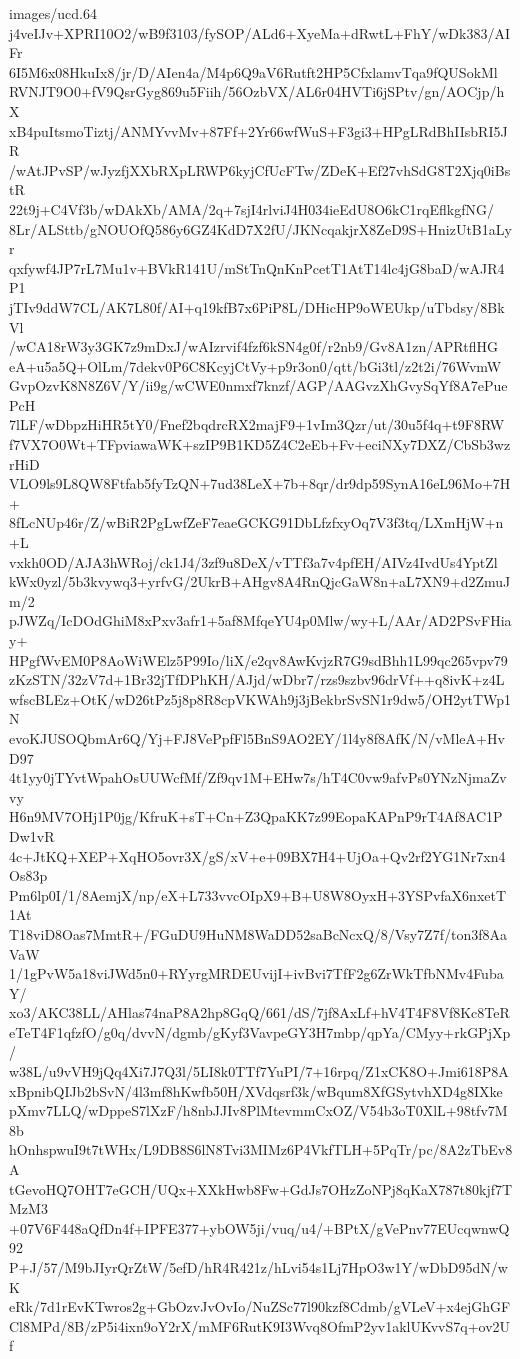 \begin{filecontents*}{images/ucd.64}
j4veIJv+XPRI10O2/wB9f3103/fySOP/ALd6+XyeMa+dRwtL+FhY/wDk383/AIFr
6I5M6x08HkuIx8/jr/D/AIen4a/M4p6Q9aV6Rutft2HP5CfxlamvTqa9fQUSokMl
RVNJT9O0+fV9QsrGyg869u5Fiih/56OzbVX/AL6r04HVTi6jSPtv/gn/AOCjp/hX
xB4puItsmoTiztj/ANMYvvMv+87Ff+2Yr66wfWuS+F3gi3+HPgLRdBhIIsbRI5JR
/wAtJPvSP/wJyzfjXXbRXpLRWP6kyjCfUcFTw/ZDeK+Ef27vhSdG8T2Xjq0iBstR
22t9j+C4Vf3b/wDAkXb/AMA/2q+7sjI4rlviJ4H034ieEdU8O6kC1rqEflkgfNG/
8Lr/ALSttb/gNOUOfQ586y6GZ4KdD7X2fU/JKNcqakjrX8ZeD9S+HnizUtB1aLyr
qxfywf4JP7rL7Mu1v+BVkR141U/mStTnQnKnPcetT1AtT14lc4jG8baD/wAJR4P1
jTIv9ddW7CL/AK7L80f/AI+q19kfB7x6PiP8L/DHicHP9oWEUkp/uTbdsy/8BkVl
/wCA18rW3y3GK7z9mDxJ/wAIzrvif4fzf6kSN4g0f/r2nb9/Gv8A1zn/APRtflHG
eA+u5a5Q+OlLm/7dekv0P6C8KcyjCtVy+p9r3on0/qtt/bGi3tl/z2t2i/76WvmW
GvpOzvK8N8Z6V/Y/ii9g/wCWE0nmxf7knzf/AGP/AAGvzXhGvySqYf8A7ePuePcH
7lLF/wDbpzHiHR5tY0/Fnef2bqdrcRX2majF9+1vIm3Qzr/ut/30u5f4q+t9F8RW
f7VX7O0Wt+TFpviawaWK+szIP9B1KD5Z4C2eEb+Fv+eciNXy7DXZ/CbSb3wzrHiD
VLO9ls9L8QW8Ftfab5fyTzQN+7ud38LeX+7b+8qr/dr9dp59SynA16eL96Mo+7H+
8fLcNUp46r/Z/wBiR2PgLwfZeF7eaeGCKG91DbLfzfxyOq7V3f3tq/LXmHjW+n+L
vxkh0OD/AJA3hWRoj/ck1J4/3zf9u8DeX/vTTf3a7v4pfEH/AIVz4IvdUs4YptZl
kWx0yzl/5b3kvywq3+yrfvG/2UkrB+AHgv8A4RnQjcGaW8n+aL7XN9+d2ZmuJm/2
pJWZq/IcDOdGhiM8xPxv3afr1+5af8MfqeYU4p0Mlw/wy+L/AAr/AD2PSvFHiay+
HPgfWvEM0P8AoWiWElz5P99Io/liX/e2qv8AwKvjzR7G9sdBhh1L99qc265vpv79
zKzSTN/32zV7d+1Br32jTfDPhKH/AJjd/wDbr7/rzs9szbv96drVf++q8ivK+z4L
wfscBLEz+OtK/wD26tPz5j8p8R8cpVKWAh9j3jBekbrSvSN1r9dw5/OH2ytTWp1N
evoKJUSOQbmAr6Q/Yj+FJ8VePpfFl5BnS9AO2EY/1l4y8f8AfK/N/vMleA+HvD97
4t1yy0jTYvtWpahOsUUWcfMf/Zf9qv1M+EHw7s/hT4C0vw9afvPs0YNzNjmaZvvy
H6n9MV7OHj1P0jg/KfruK+sT+Cn+Z3QpaKK7z99EopaKAPnP9rT4Af8AC1PDw1vR
4c+JtKQ+XEP+XqHO5ovr3X/gS/xV+e+09BX7H4+UjOa+Qv2rf2YG1Nr7xn4Os83p
Pm6lp0I/1/8AemjX/np/eX+L733vvcOIpX9+B+U8W8OyxH+3YSPvfaX6nxetT1At
T18viD8Oas7MmtR+/FGuDU9HuNM8WaDD52saBcNcxQ/8/Vsy7Z7f/ton3f8AaVaW
1/1gPvW5a18viJWd5n0+RYyrgMRDEUvijI+ivBvi7TfF2g6ZrWkTfbNMv4FubaY/
xo3/AKC38LL/AHlas74naP8A2hp8GqQ/661/dS/7jf8AxLf+hV4T4F8Vf8Kc8TeR
eTeT4F1qfzfO/g0q/dvvN/dgmb/gKyf3VavpeGY3H7mbp/qpYa/CMyy+rkGPjXp/
w38L/u9vVH9jQq4Xi7J7Q3l/5LI8k0TTf7YuPI/7+16rpq/Z1xCK8O+Jmi618P8A
xBpnibQIJb2bSvN/4l3mf8hKwfb50H/XVdqsrf3k/wBqum8XfGSytvhXD4g8IXke
pXmv7LLQ/wDppeS7lXzF/h8nbJJIv8PlMtevmmCxOZ/V54b3oT0XlL+98tfv7M8b
hOnhspwuI9t7tWHx/L9DB8S6lN8Tvi3MIMz6P4VkfTLH+5PqTr/pc/8A2zTbEv8A
tGevoHQ7OHT7eGCH/UQx+XXkHwb8Fw+GdJs7OHzZoNPj8qKaX787t80kjf7TMzM3
+07V6F448aQfDn4f+IPFE377+ybOW5ji/vuq/u4/+BPtX/gVePnv77EUcqwnwQ92
P+J/57/M9bJIyrQrZtW/5efD/hR4R421z/hLvi54s1Lj7HpO3w1Y/wDbD95dN/wK
eRk/7d1rEvKTwros2g+GbOzvJvOvIo/NuZSc77l90kzf8Cdmb/gVLeV+x4ejGhGF
Cl8MPd/8B/zP5i4ixn9oY2rX/mMF6RutK9I3Wvq8OfmP2yv1aklUKvvS7q+ov2Uf

\end{filecontents*}
